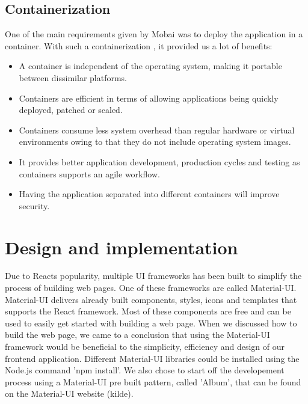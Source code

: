 





\subsection*{Containerization}
One of the main requirements given by Mobai was to deploy the application in a container. With such a containerization \cite{Containerization}, it provided us a lot of benefits:
\begin{itemize}
    \item A container is independent of the operating system, making it portable between dissimilar platforms. 
    \item Containers are efficient in terms of allowing applications being quickly deployed, patched or scaled. 
    \item Containers consume less system overhead than regular hardware or virtual environments owing to that they do not include operating system images. 
    \item It provides better application development, production cycles and testing as containers supports an agile workflow.
    \item Having the application separated into different containers will improve security. 
\end{itemize}

\section{Design and implementation}
Due to Reacts popularity, multiple UI frameworks has been built to simplify the process of building web pages. One of these frameworks are called Material-UI. Material-UI delivers already built components, styles, icons and templates that supports the React framework. Most of these components are free and can be used to easily get started with building a web page. When we discussed how to build the web page, we came to a conclusion that using the Material-UI framework would be beneficial to the simplicity, efficiency and design of our frontend application. Different Material-UI libraries could be installed using the Node.js command 'npm install'. We also chose to start off the developement process using a Material-UI pre built pattern, called 'Album', that can be found on the Material-UI website (kilde). 


